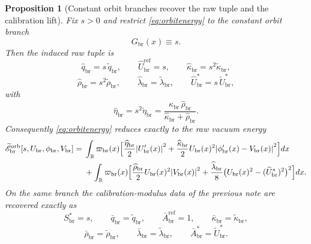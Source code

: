 \documentclass[11pt]{article}
\newcommand{\ProfWeight}{\varpi_{\mathrm{br}}}
\newcommand{\RespVacAmp}{U_{\mathrm{br}}}
\newcommand{\RespVacPhase}{\phi_{\mathrm{br}}}
\newcommand{\RespVacCarrier}{V_{\mathrm{br}}}
\newcommand{\RespScaleEq}{S_{\mathrm{br}}^{\ast}}
\newcommand{\RespScaleReadout}{\bar q_{\mathrm{br}}}
\newcommand{\RespScaleAmpRef}{\bar A_{\mathrm{br}}^{\mathrm{ref}}}
\newcommand{\RespScaleCov}{\bar\kappa_{\mathrm{br}}}
\newcommand{\RespScaleRelax}{\bar\rho_{\mathrm{br}}}
\newcommand{\RespScaleWell}{\bar\lambda_{\mathrm{br}}}
\newcommand{\RespScaleAmpEq}{\bar A_{\mathrm{br}}^{\ast}}
\newcommand{\RespRawReadout}{\widehat q_{\mathrm{br}}}
\newcommand{\RespRawRef}{\widehat U_{\mathrm{br}}^{\mathrm{ref}}}
\newcommand{\RespRawCov}{\widehat\kappa_{\mathrm{br}}}
\newcommand{\RespRawRelax}{\widehat\rho_{\mathrm{br}}}
\newcommand{\RespRawWell}{\widehat\lambda_{\mathrm{br}}}
\newcommand{\RespRawEq}{\widehat U_{\mathrm{br}}^{\ast}}
\newcommand{\RespRawIso}{\widehat\eta_{\mathrm{br}}}
\newcommand{\RespShapeReadout}{\widetilde q_{\mathrm{br}}}
\newcommand{\RespShapeCov}{\widetilde\kappa_{\mathrm{br}}}
\newcommand{\RespShapeRelax}{\widetilde\rho_{\mathrm{br}}}
\newcommand{\RespShapeWell}{\widetilde\lambda_{\mathrm{br}}}
\newcommand{\RespShapeEq}{\widetilde U_{\mathrm{br}}^{\ast}}
\newcommand{\RespShapeIso}{\widetilde\eta_{\mathrm{br}}}
\newcommand{\RespOrbitField}{G_{\mathrm{br}}}
\newcommand{\RespOrbitEnergy}{\widetilde{\mathscr E}_{\mathrm{br}}^{\mathrm{orb}}}
\newtheorem{proposition}{Proposition}
\begin{document}
\begin{proposition}[Constant orbit branches recover the raw tuple and the calibration lift]
\label{prop:branchraw}
Fix \(s>0\) and restrict \eqref{eq:orbitenergy} to the constant orbit branch
\begin{equation}
\RespOrbitField(x)\equiv s.
\label{eq:constbranch}
\end{equation}
Then the induced raw tuple is
\begin{equation}
\RespRawReadout=s\,\RespShapeReadout,
\qquad
\RespRawRef=s,
\qquad
\RespRawCov=s^2\RespShapeCov,
\label{eq:rawfromshapeA}
\end{equation}
\begin{equation}
\RespRawRelax=s^2\RespShapeRelax,
\qquad
\RespRawWell=\RespShapeWell,
\qquad
\RespRawEq=s\,\RespShapeEq,
\label{eq:rawfromshapeB}
\end{equation}
with
\begin{equation}
\RespRawIso=s^2\RespShapeIso
=
\frac{\RespRawCov\,\RespRawRelax}{\RespRawCov+\RespRawRelax}.
\label{eq:rawisofromshape}
\end{equation}
Consequently \eqref{eq:orbitenergy} reduces exactly to the raw vacuum energy
\begin{align}
\RespOrbitEnergy[s,\RespVacAmp,\RespVacPhase,\RespVacCarrier]
=\;&
\int_{\mathbb R}\ProfWeight(x)\Bigl[
\frac{\RespRawIso}{2}\abs{\RespVacAmp'(x)}^2
+
\frac{\RespRawCov}{2}\RespVacAmp(x)^2\abs{\RespVacPhase'(x)-\RespVacCarrier(x)}^2
\Bigr]dx
\nonumber\\
&+
\int_{\mathbb R}\ProfWeight(x)\Bigl[
\frac{\RespRawRelax}{2}\RespVacAmp(x)^2\abs{\RespVacCarrier(x)}^2
+
\frac{\RespRawWell}{8}\bigl(\RespVacAmp(x)^2-(\RespRawEq)^2\bigr)^2
\Bigr]dx.
\label{eq:rawenergyderived}
\end{align}
On the same branch the calibration-modulus data of the previous note are recovered exactly as
\begin{equation}
\RespScaleEq=s,
\qquad
\RespScaleReadout=\RespShapeReadout,
\qquad
\RespScaleAmpRef=1,
\qquad
\RespScaleCov=\RespShapeCov,
\label{eq:scalefromshapeA}
\end{equation}
\begin{equation}
\RespScaleRelax=\RespShapeRelax,
\qquad
\RespScaleWell=\RespShapeWell,
\qquad
\RespScaleAmpEq=\RespShapeEq.
\label{eq:scalefromshapeB}
\end{equation}
\end{proposition}
\end{document}
